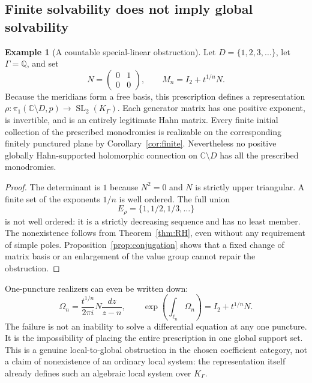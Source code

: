 \documentclass[11pt,letterpaper]{article}
\numberwithin{equation}{section}
\theoremstyle{definition}
\newtheorem{example}[theorem]{Example}
\theoremstyle{remark}
\newcommand{\C}{\mathbb C}
\newcommand{\Q}{\mathbb Q}
\newcommand{\SL}{\operatorname{SL}}
\newcommand{\K}{K_\Gamma}
\begin{document}
\subsection{Finite solvability does not imply global solvability}
\begin{example}[A countable special-linear obstruction]\label{ex:descending}
Let $D=\{1,2,3,\ldots\}$, let $\Gamma=\Q$, and set
\[
 N=\begin{pmatrix}0&1\\0&0\end{pmatrix},\qquad
 M_n=I_2+t^{1/n}N.
\]
Because the meridians form a free basis, this prescription defines a
representation $\rho:\pi_1(\C\setminus D,p)\to\SL_2(\K)$. Each generator
matrix has one positive exponent, is invertible, and is an entirely
legitimate Hahn matrix. Every finite initial collection of the prescribed
monodromies is realizable on the corresponding finitely punctured plane by
Corollary~\ref{cor:finite}. Nevertheless no positive globally Hahn-supported
holomorphic connection on $\C\setminus D$ has all the prescribed monodromies.
\end{example}
\begin{proof}
The determinant is $1$ because $N^2=0$ and $N$ is strictly upper triangular.
A finite set of the exponents $1/n$ is well ordered. The full union
\[
 E_\rho=\{1,1/2,1/3,\ldots\}
\]
is not well ordered: it is a strictly decreasing sequence and has no least
member. The nonexistence follows from Theorem~\ref{thm:RH}, even without any
requirement of simple poles. Proposition~\ref{prop:conjugation} shows that a
fixed change of matrix basis or an enlargement of the value group cannot
repair the obstruction.
\end{proof}

One-puncture realizers can even be written down:
\[
 \Omega_n=\frac{t^{1/n}}{2\pi i}N\frac{dz}{z-n},
 \qquad
 \exp\left(\int_{\ell_n}\Omega_n\right)=I_2+t^{1/n}N.
\]
The failure is not an inability to solve a differential equation at any one
puncture. It is the impossibility of placing the entire prescription in one
global support set. This is a genuine local-to-global obstruction in the
chosen coefficient category, not a claim of nonexistence of an ordinary
local system: the representation itself already defines such an algebraic
local system over $\K$.
\end{document}
